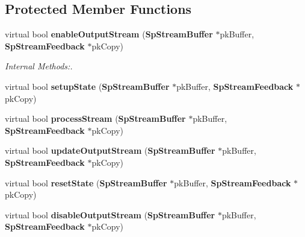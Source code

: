 \subsection*{Protected Member Functions}
\begin{CompactItemize}
\item 
virtual bool {\bf enable\-Output\-Stream} ({\bf Sp\-Stream\-Buffer} $\ast$pk\-Buffer, {\bf Sp\-Stream\-Feedback} $\ast$pk\-Copy)
\begin{CompactList}\small\item\em Internal Methods:. \item\end{CompactList}\item 
virtual bool {\bf setup\-State} ({\bf Sp\-Stream\-Buffer} $\ast$pk\-Buffer, {\bf Sp\-Stream\-Feedback} $\ast$pk\-Copy)
\item 
virtual bool {\bf process\-Stream} ({\bf Sp\-Stream\-Buffer} $\ast$pk\-Buffer, {\bf Sp\-Stream\-Feedback} $\ast$pk\-Copy)
\item 
virtual bool {\bf update\-Output\-Stream} ({\bf Sp\-Stream\-Buffer} $\ast$pk\-Buffer, {\bf Sp\-Stream\-Feedback} $\ast$pk\-Copy)
\item 
virtual bool {\bf reset\-State} ({\bf Sp\-Stream\-Buffer} $\ast$pk\-Buffer, {\bf Sp\-Stream\-Feedback} $\ast$pk\-Copy)
\item 
virtual bool {\bf disable\-Output\-Stream} ({\bf Sp\-Stream\-Buffer} $\ast$pk\-Buffer, {\bf Sp\-Stream\-Feedback} $\ast$pk\-Copy)
\end{CompactItemize}
